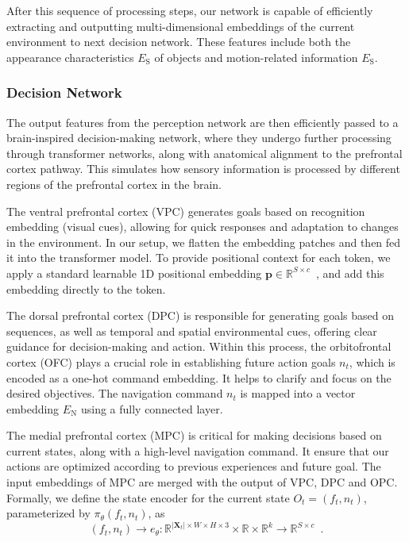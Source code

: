 %
After this sequence of processing steps, our network is capable of efficiently extracting and outputting multi-dimensional embeddings of the current environment to next decision network. 
These features include both the appearance characteristics $ E_\text{S} $ of objects and motion-related information $ E_\text{S} $.



\subsubsection{Decision Network}
The output features from the perception network are then efficiently passed to a brain-inspired decision-making network, where they undergo further processing through transformer networks, along with anatomical alignment to the prefrontal cortex pathway. 
This simulates how sensory information is processed by different regions of the prefrontal cortex in the brain.
%


The ventral prefrontal cortex (VPC) generates goals based on recognition embedding (visual cues), allowing for quick responses and adaptation to changes in the environment.
%
In our setup, we flatten the embedding patches and then fed it into the transformer model.
To provide positional context for each token, we apply a standard learnable 1D positional embedding $\mathbf{p}\in \mathbb{R}^{S\times c}$~\cite{Alexey:2021}, and add this embedding directly to the token.


The dorsal prefrontal cortex (DPC) is responsible for generating goals based on sequences, as well as temporal and spatial environmental cues, offering clear guidance for decision-making and action.
Within this process, the orbitofrontal cortex (OFC) plays a crucial role in establishing future action goals $n_t$, which is encoded as a one-hot command embedding.
It helps to clarify and focus on the desired objectives. 
The navigation command $n_t$ is mapped into a vector embedding $E_\text{N}$ using a fully connected layer.



The medial prefrontal cortex (MPC) is critical for making decisions based on current states, along with a high-level navigation command.
It ensure that our actions are optimized according to previous experiences and future goal.
The input embeddings of MPC are merged with the output of VPC, DPC and OPC.
Formally, we define the state encoder for the current state $O_t=(f_t, n_t)$, parameterized by $ \pi_{\theta}(f_t, n_t) $, as
\begin{equation}\label{eq:encoder}
	(f_t, n_t) \rightarrow 
	e_{\theta}: \mathbb{R}^{|\mathbf{X}_{t}|\times W\times H\times3}\times\mathbb{R}\times \mathbb{R}^k \rightarrow \mathbb{R}^{S \times c} \enspace .
\end{equation}


